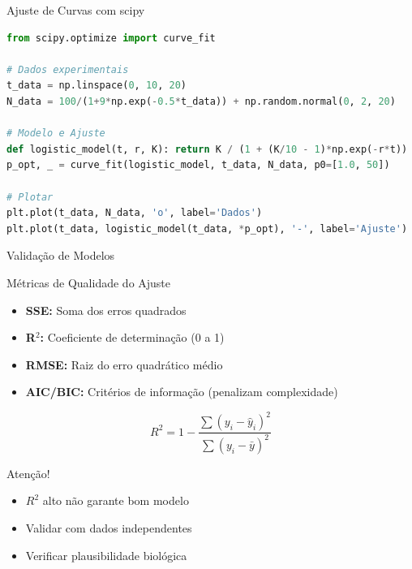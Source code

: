 \begin{frame}{Ajuste de Curvas com scipy}
\begin{lstlisting}[language=Python, caption=Estimação de parâmetros, basicstyle=\ttfamily\footnotesize]
from scipy.optimize import curve_fit

# Dados experimentais
t_data = np.linspace(0, 10, 20)
N_data = 100/(1+9*np.exp(-0.5*t_data)) + np.random.normal(0, 2, 20)

# Modelo e Ajuste
def logistic_model(t, r, K): return K / (1 + (K/10 - 1)*np.exp(-r*t))
p_opt, _ = curve_fit(logistic_model, t_data, N_data, p0=[1.0, 50])

# Plotar
plt.plot(t_data, N_data, 'o', label='Dados')
plt.plot(t_data, logistic_model(t_data, *p_opt), '-', label='Ajuste')
\end{lstlisting}
\end{frame}

\begin{frame}[allowframebreaks]{Validação de Modelos}
\begin{block}{Métricas de Qualidade do Ajuste}
\begin{itemize}
    \item \textbf{SSE:} Soma dos erros quadrados
    \item \textbf{R$^2$:} Coeficiente de determinação (0 a 1)
    \item \textbf{RMSE:} Raiz do erro quadrático médio
    \item \textbf{AIC/BIC:} Critérios de informação (penalizam complexidade)
\end{itemize}
\end{block}

\begin{equation*}
R^2 = 1 - \frac{\sum (y_i - \hat{y}_i)^2}{\sum (y_i - \bar{y})^2}
\end{equation*}

\begin{alertblock}{Atenção!}
\begin{itemize}
    \item $R^2$ alto não garante bom modelo
    \item Validar com dados independentes
    \item Verificar plausibilidade biológica
\end{itemize}
\end{alertblock}
\end{frame}

